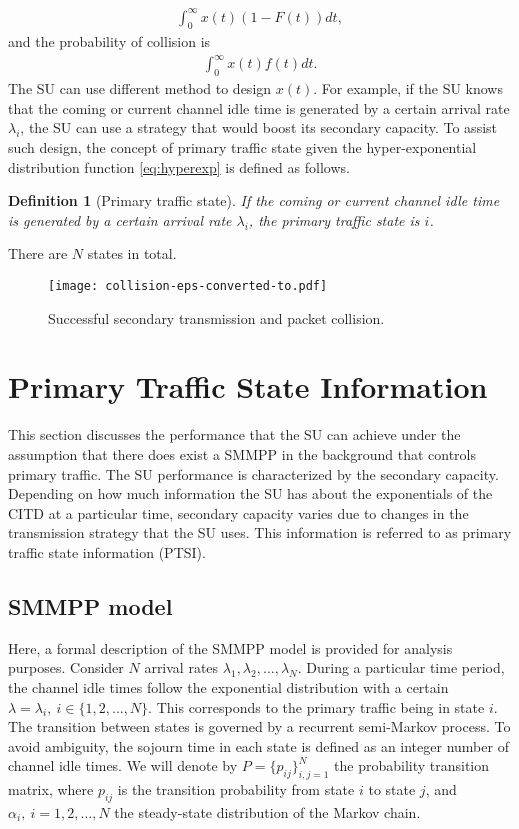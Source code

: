 \documentclass[10pt,final,journal,letterpaper]{IEEEtran}
\newtheorem{definition}{Definition}
\begin{document}
\begin{align}
    \int_0^{\infty}x(t)(1-F(t))dt,\nonumber
\end{align}
and the probability of collision is
\begin{align}
    \int_0^{\infty}x(t)f(t)dt.\nonumber
\end{align}
The SU can use different method to design $x(t)$. For example, if the SU knows that the coming or current channel idle time is generated by a certain arrival rate $\lambda_i$, the SU can use a strategy that would boost its secondary capacity. To assist such design, the concept of primary traffic state given the hyper-exponential distribution function \ref{eq:hyperexp} is defined as follows.
\begin{definition}[Primary traffic state]
If the coming or current channel idle time is generated by a certain arrival rate $\lambda_i$, the primary traffic state is $i$.
\end{definition}
There are $N$ states in total.
\begin{figure}[!t]
\centering
\texttt{[image: collision-eps-converted-to.pdf]}
\caption{Successful secondary transmission and packet collision.}
\label{fig:collision}
\end{figure}

\section{Primary Traffic State Information}\label{sec:4}
This section discusses the performance that the SU can achieve under the assumption that there does exist a SMMPP in the background that controls primary traffic. The SU performance is characterized by the secondary capacity. Depending on how much information the SU has about the exponentials of the CITD at a particular time, secondary capacity varies due to changes in the transmission strategy that the SU uses. This information is referred to as primary traffic state information (PTSI).
\subsection{SMMPP model}
Here, a formal description of the SMMPP model is provided for analysis purposes. Consider $N$ arrival rates $\lambda_1,\lambda_2,\ldots,\lambda_N$. During a particular time period, the channel idle times follow the exponential distribution with a certain $\lambda=\lambda_i,\ i\in\{1,2,\ldots,N\}$. This corresponds to the primary traffic being in state $i$. The transition between states is governed by a recurrent semi-Markov process. To avoid ambiguity, the sojourn time in each state is defined as an integer number of channel idle times. We will denote by $P=\{p_{ij}\}_{i,j=1}^N$ the probability transition matrix, where $p_{ij}$ is the transition probability from state $i$ to state $j$, and $\alpha_i,\ i=1,2,\ldots,N$ the steady-state distribution of the Markov chain.
\end{document}
